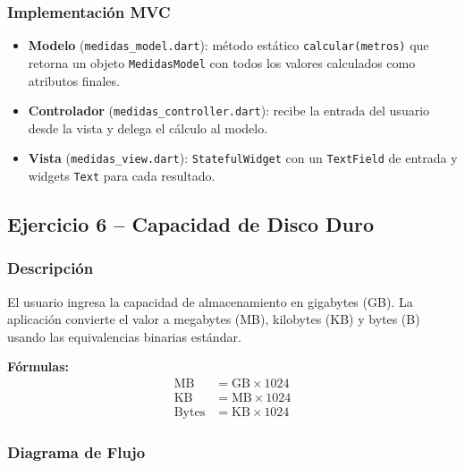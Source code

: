 \documentclass[12pt,a4paper]{article}
\begin{document}
\subsubsection{Implementación MVC}

\begin{itemize}
  \item \textbf{Modelo} (\texttt{medidas\_model.dart}): método estático \texttt{calcular(metros)} que retorna un objeto \texttt{MedidasModel} con todos los valores calculados como atributos finales.
  \item \textbf{Controlador} (\texttt{medidas\_controller.dart}): recibe la entrada del usuario desde la vista y delega el cálculo al modelo.
  \item \textbf{Vista} (\texttt{medidas\_view.dart}): \texttt{StatefulWidget} con un \texttt{TextField} de entrada y widgets \texttt{Text} para cada resultado.
\end{itemize}

\subsection{Ejercicio 6 -- Capacidad de Disco Duro}

\subsubsection{Descripción}

El usuario ingresa la capacidad de almacenamiento en gigabytes (GB). La aplicación convierte el valor a megabytes (MB), kilobytes (KB) y bytes (B) usando las equivalencias binarias estándar.

\textbf{Fórmulas:}
\begin{align}
  \text{MB}    &= \text{GB} \times 1024 \\[4pt]
  \text{KB}    &= \text{MB} \times 1024 \\[4pt]
  \text{Bytes} &= \text{KB} \times 1024
\end{align}

\subsubsection{Diagrama de Flujo}
\end{document}
